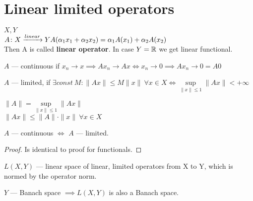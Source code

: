 \section{Linear limited operators}
\begin{defn}
  $X, Y$ \\
  $A \colon X \xrightarrow{linear} Y\\
  A(\alpha_1 x_1 + \alpha_2 x_2) = \alpha_1A(x_1) + \alpha_2 A(x_2)$ \\
  Then A is called \textbf{linear operator}. In case $Y = \mathbb{R}$ we get linear functional.
\end{defn}

\begin{defn}
  $A$ --- continuous if $x_n \to x \implies Ax_n \to Ax \iff x_n \to 0 \implies
  Ax_n \to 0 = A0$
\end{defn}

\begin{defn}
  $A$ --- limited, if $\exists const\ M : \|Ax\| \leq M \|x\|\ \forall x \in X
  \iff \sup\limits_{\|x\| \leq 1} \|Ax\| < +\infty$
\end{defn}

\begin{defn}
  $\|A\| = \sup\limits_{\|x\| \leq 1} \|Ax\|$ \\
  $\|Ax\| \leq \|A\| \cdot \|x\|\ \forall x \in X$
\end{defn}

\begin{thm}
  $A$ --- continuous $\iff$ $A$ --- limited.
\end{thm}

\begin{proof}
  Is identical to proof for functionals.
\end{proof}

\begin{note}
  $L(X, Y)$ --- linear space of linear, limited operators from X to Y, which is
  normed by the operator norm.
\end{note}

\begin{thm}
  $Y$ --- Banach space $\implies L(X, Y)$ is also a Banach space.
\end{thm}